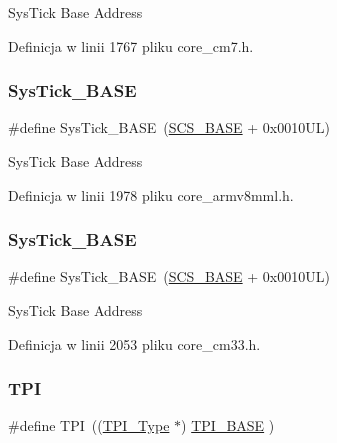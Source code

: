 Sys\+Tick Base Address 

Definicja w linii 1767 pliku core\+\_\+cm7.\+h.

\mbox{\label{group___c_m_s_i_s__core__base_ga58effaac0b93006b756d33209e814646}} 
\subsubsection{\texorpdfstring{Sys\+Tick\+\_\+\+B\+A\+SE}{SysTick\_BASE}\hspace{0.1cm}{\footnotesize\ttfamily [11/12]}}
{\footnotesize\ttfamily \#define Sys\+Tick\+\_\+\+B\+A\+SE~(\hyperlink{group___c_m_s_i_s__core__base_ga3c14ed93192c8d9143322bbf77ebf770}{S\+C\+S\+\_\+\+B\+A\+SE} +  0x0010\+U\+L)}

Sys\+Tick Base Address 

Definicja w linii 1978 pliku core\+\_\+armv8mml.\+h.

\mbox{\label{group___c_m_s_i_s__core__base_ga58effaac0b93006b756d33209e814646}} 
\subsubsection{\texorpdfstring{Sys\+Tick\+\_\+\+B\+A\+SE}{SysTick\_BASE}\hspace{0.1cm}{\footnotesize\ttfamily [12/12]}}
{\footnotesize\ttfamily \#define Sys\+Tick\+\_\+\+B\+A\+SE~(\hyperlink{group___c_m_s_i_s__core__base_ga3c14ed93192c8d9143322bbf77ebf770}{S\+C\+S\+\_\+\+B\+A\+SE} +  0x0010\+U\+L)}

Sys\+Tick Base Address 

Definicja w linii 2053 pliku core\+\_\+cm33.\+h.

\mbox{\label{group___c_m_s_i_s__core__base_ga8b4dd00016aed25a0ea54e9a9acd1239}} 
\subsubsection{\texorpdfstring{T\+PI}{TPI}\hspace{0.1cm}{\footnotesize\ttfamily [1/8]}}
{\footnotesize\ttfamily \#define T\+PI~((\hyperlink{struct_t_p_i___type}{T\+P\+I\+\_\+\+Type}       $\ast$)     \hyperlink{group___c_m_s_i_s__core__base_ga2b1eeff850a7e418844ca847145a1a68}{T\+P\+I\+\_\+\+B\+A\+SE}         )}

